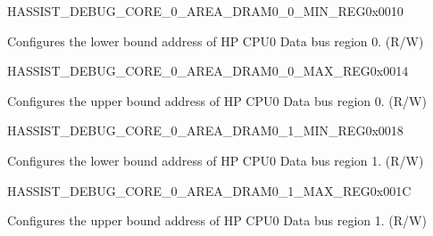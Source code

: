 \begin{register}{H}{ASSIST\_DEBUG\_CORE\_0\_AREA\_DRAM0\_0\_MIN\_REG}{0x0010}\label{regdesc:ASSISTDEBUGCORE0AREADRAM00MINREG}
%
\regnewline%
\begin{regdesc}\begin{reglist}
\label{fielddesc:ASSISTDEBUGCORE0AREADRAM00MIN}\item [ASSIST\_DEBUG\_CORE\_0\_AREA\_DRAM0\_0\_MIN] Configures the lower bound address of HP CPU0 Data bus region 0. (R/W)
\end{reglist}\end{regdesc}
\end{register}


\begin{register}{H}{ASSIST\_DEBUG\_CORE\_0\_AREA\_DRAM0\_0\_MAX\_REG}{0x0014}\label{regdesc:ASSISTDEBUGCORE0AREADRAM00MAXREG}
%
\regnewline%
\begin{regdesc}\begin{reglist}
\label{fielddesc:ASSISTDEBUGCORE0AREADRAM00MAX}\item [ASSIST\_DEBUG\_CORE\_0\_AREA\_DRAM0\_0\_MAX] Configures the upper bound address of HP CPU0 Data bus region 0. (R/W)
\end{reglist}\end{regdesc}
\end{register}


\begin{register}{H}{ASSIST\_DEBUG\_CORE\_0\_AREA\_DRAM0\_1\_MIN\_REG}{0x0018}\label{regdesc:ASSISTDEBUGCORE0AREADRAM01MINREG}
%
\regnewline%
\begin{regdesc}\begin{reglist}
\label{fielddesc:ASSISTDEBUGCORE0AREADRAM01MIN}\item [ASSIST\_DEBUG\_CORE\_0\_AREA\_DRAM0\_1\_MIN] Configures the lower bound address of HP CPU0 Data bus region 1. (R/W)
\end{reglist}\end{regdesc}
\end{register}


\begin{register}{H}{ASSIST\_DEBUG\_CORE\_0\_AREA\_DRAM0\_1\_MAX\_REG}{0x001C}\label{regdesc:ASSISTDEBUGCORE0AREADRAM01MAXREG}
%
\regnewline%
\begin{regdesc}\begin{reglist}
\label{fielddesc:ASSISTDEBUGCORE0AREADRAM01MAX}\item [ASSIST\_DEBUG\_CORE\_0\_AREA\_DRAM0\_1\_MAX] Configures the upper bound address of HP CPU0 Data bus region 1. (R/W)
\end{reglist}\end{regdesc}
\end{register}


